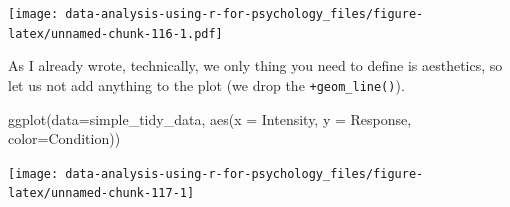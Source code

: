 \documentclass[
]{book}
\newenvironment{Shaded}{\begin{snugshade}}{\end{snugshade}}
\newcommand{\AttributeTok}[1]{\textcolor[rgb]{0.77,0.63,0.00}{#1}}
\newcommand{\FunctionTok}[1]{\textcolor[rgb]{0.00,0.00,0.00}{#1}}
\newcommand{\NormalTok}[1]{#1}
\begin{document}
\texttt{[image: data-analysis-using-r-for-psychology\_files/figure-latex/unnamed-chunk-116-1.pdf]}

As I already wrote, technically, we only thing you need to define is aesthetics, so let us not add anything to the plot (we drop the \texttt{+geom\_line()}).

\begin{Shaded}
\begin{Highlighting}[]
\FunctionTok{ggplot}\NormalTok{(}\AttributeTok{data=}\NormalTok{simple\_tidy\_data, }\FunctionTok{aes}\NormalTok{(}\AttributeTok{x =}\NormalTok{ Intensity, }\AttributeTok{y =}\NormalTok{ Response, }\AttributeTok{color=}\NormalTok{Condition))}
\end{Highlighting}
\end{Shaded}

\begin{center}\texttt{[image: data-analysis-using-r-for-psychology\_files/figure-latex/unnamed-chunk-117-1]} \end{center}
\end{document}
